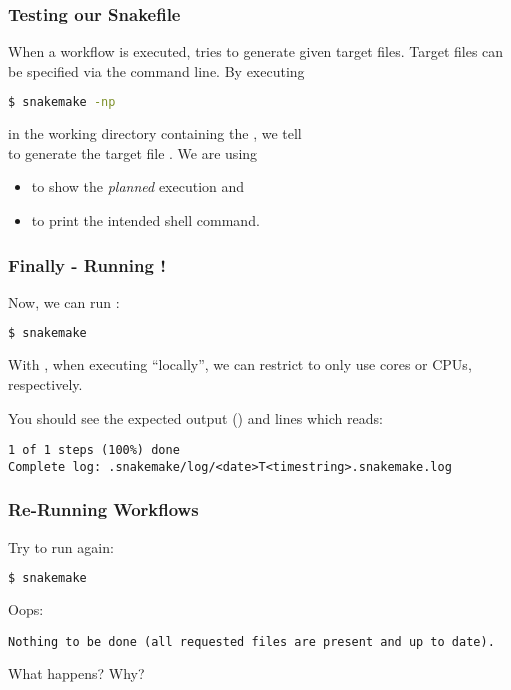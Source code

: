 \begin{frame}[fragile]
  \frametitle{Testing our Snakefile}
  When a workflow is executed, \Snakemake{} tries to generate given target files. Target files can be specified via the command line. By executing
  \begin{lstlisting}[language=Bash, style=Shell]
$ snakemake -np
  \end{lstlisting}
  in the working directory containing the , we tell \\\Snakemake{} to generate the target file .\newline
  We are using 
  \begin{itemize}[<+->]
   \item {} to show the \emph{planned} execution and
   \item {} to print the intended shell command.
  \end{itemize} 
\end{frame}

\begin{frame}[fragile]
  \frametitle{Finally - Running \Snakemake{}!}
  Now, we can run \Snakemake{}:
  \begin{lstlisting}[language=Bash, style=Shell]
$ snakemake
  \end{lstlisting}
  \begin{docs}[Note:]
  	With , when executing ``locally'', we can restrict \Snakemake{} to only use  cores or CPUs, respectively.
  \end{docs}
  You should see the expected output () and lines which reads:
  \begin{lstlisting}[style=Plain, basicstyle=\footnotesize]
1 of 1 steps (100%) done
Complete log: .snakemake/log/<date>T<timestring>.snakemake.log
  \end{lstlisting}
\end{frame}

\begin{frame}[fragile]
  \frametitle{Re-Running Workflows}
  Try to run \Snakemake{} again:
  \begin{lstlisting}[language=Bash, style=Shell]
$ snakemake
  \end{lstlisting}
  \pause
  Oops:
  \begin{lstlisting}[style=Plain, basicstyle=\footnotesize]
Nothing to be done (all requested files are present and up to date).
  \end{lstlisting}
  \begin{question}
  	What happens? Why?
  \end{question}
\end{frame}

